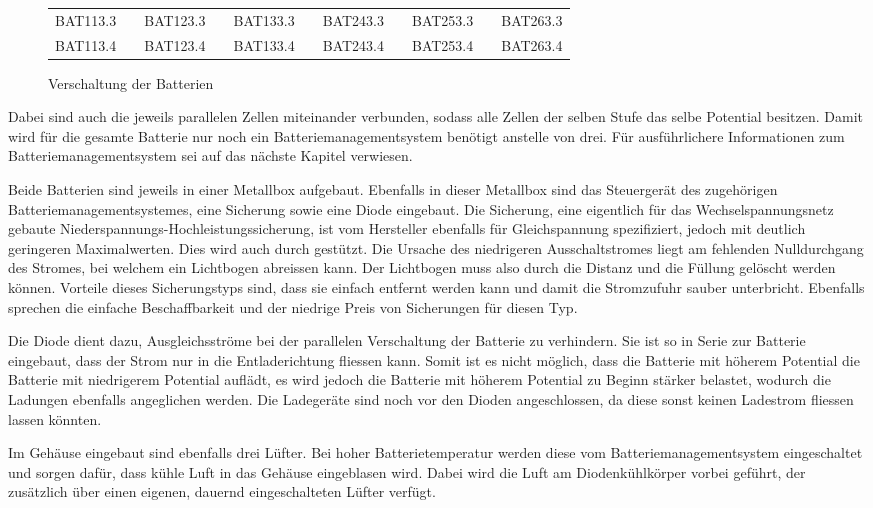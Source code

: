 \begin{figure}[h]
\begin{tabular}{lp{2mm}lp{2mm}lp{1.5cm}lp{2mm}lp{2mm}l}
\multicolumn{1}{|l|}{BAT113.3} & \multicolumn{1}{l|}{} & \multicolumn{1}{l|}{BAT123.3} & \multicolumn{1}{l|}{} & \multicolumn{1}{l|}{BAT133.3} & \multicolumn{1}{l|}{} & \multicolumn{1}{l|}{BAT243.3} & \multicolumn{1}{l|}{} & \multicolumn{1}{l|}{BAT253.3} & \multicolumn{1}{l|}{} & \multicolumn{1}{l|}{BAT263.3} \\ \cline{1-1} \cline{3-3} \cline{5-5} \cline{7-7} \cline{9-9} \cline{11-11} 
\multicolumn{1}{|l|}{BAT113.4} & \multicolumn{1}{l|}{} & \multicolumn{1}{l|}{BAT123.4} & \multicolumn{1}{l|}{} & \multicolumn{1}{l|}{BAT133.4} & \multicolumn{1}{l|}{} & \multicolumn{1}{l|}{BAT243.4} & \multicolumn{1}{l|}{} & \multicolumn{1}{l|}{BAT253.4} & \multicolumn{1}{l|}{} & \multicolumn{1}{l|}{BAT263.4} \\ \cline{1-1} \cline{3-3} \cline{5-5} \cline{7-7} \cline{9-9} \cline{11-11} 
\end{tabular}
	\caption{Verschaltung der Batterien}
	\label{fig:schema_batterie}
\end{figure}

Dabei sind auch die jeweils parallelen Zellen miteinander verbunden, sodass alle Zellen der selben Stufe das selbe Potential besitzen. Damit wird für die gesamte Batterie nur noch ein Batteriemanagementsystem benötigt anstelle von drei. Für ausführlichere Informationen zum Batteriemanagementsystem sei auf das nächste Kapitel verwiesen.

Beide Batterien sind jeweils in einer Metallbox aufgebaut. Ebenfalls in dieser Metallbox sind das Steuergerät des zugehörigen Batteriemanagementsystemes, eine Sicherung sowie eine Diode eingebaut. Die Sicherung, eine eigentlich für das Wechselspannungsnetz gebaute Niederspannungs-Hochleistungssicherung, ist vom Hersteller ebenfalls für Gleichspannung spezifiziert, jedoch mit deutlich geringeren Maximalwerten. Dies wird auch durch \cite{siba} gestützt. Die Ursache des niedrigeren Ausschaltstromes liegt am fehlenden Nulldurchgang des Stromes, bei welchem ein Lichtbogen abreissen kann. Der Lichtbogen muss also durch die Distanz und die Füllung gelöscht werden können. Vorteile dieses Sicherungstyps sind, dass sie einfach entfernt werden kann und damit die Stromzufuhr sauber unterbricht. Ebenfalls sprechen die einfache Beschaffbarkeit und der niedrige Preis von Sicherungen für diesen Typ.

Die Diode dient dazu, Ausgleichsströme bei der parallelen Verschaltung der Batterie zu verhindern. Sie ist so in Serie zur Batterie eingebaut, dass der Strom nur in die Entladerichtung fliessen kann. Somit ist es nicht möglich, dass die Batterie mit höherem Potential die Batterie mit niedrigerem Potential auflädt, es wird jedoch die Batterie mit höherem Potential zu Beginn stärker belastet, wodurch die Ladungen ebenfalls angeglichen werden. Die Ladegeräte sind noch vor den Dioden angeschlossen, da diese sonst keinen Ladestrom fliessen lassen könnten.

Im Gehäuse eingebaut sind ebenfalls drei Lüfter. Bei hoher Batterietemperatur werden diese vom Batteriemanagementsystem eingeschaltet und sorgen dafür, dass kühle Luft in das Gehäuse eingeblasen wird. Dabei wird die Luft am Diodenkühlkörper vorbei geführt, der zusätzlich über einen eigenen, dauernd eingeschalteten Lüfter verfügt.